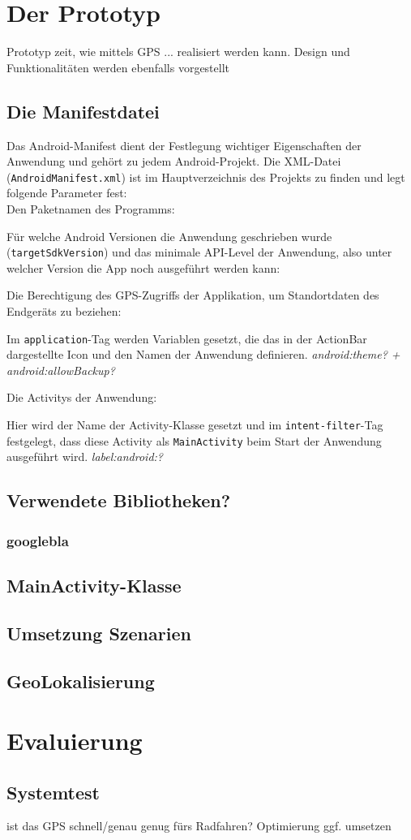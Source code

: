 \chapter{\label{chap:implementierung}Der Prototyp}
Prototyp zeit, wie mittels GPS ... realisiert werden kann.
Design und Funktionalitäten werden ebenfalls vorgestellt
\section{Die Manifestdatei}
Das Android-Manifest dient der Festlegung wichtiger Eigenschaften der Anwendung und gehört zu jedem Android-Projekt. Die \gls{XML}-Datei (\texttt{AndroidManifest.xml}) ist im Hauptverzeichnis des Projekts zu finden und legt folgende Parameter fest: \\
Den Paketnamen des Programms:

Für welche Android Versionen die Anwendung geschrieben wurde (\texttt{targetSdkVersion}) und das minimale \gls{API}-Level der Anwendung, also unter welcher Version die App noch ausgeführt werden kann:

Die Berechtigung des \gls{GPS}-Zugriffs der Applikation, um Standortdaten des Endgeräts zu beziehen:

Im \texttt{application}-Tag werden Variablen gesetzt, die das in der ActionBar dargestellte Icon und den Namen der Anwendung definieren. \textit{android:theme? + android:allowBackup?}

Die \glspl{Activity} der Anwendung:

Hier wird der Name der \gls{Activity}-Klasse gesetzt und im \texttt{intent-filter}-Tag festgelegt, dass diese \gls{Activity} als \texttt{MainActivity} beim Start der Anwendung ausgeführt wird. \textit{label:android:?}
\section{Verwendete Bibliotheken?}
\subsection{googlebla}
\section{MainActivity-Klasse}
\section{Umsetzung Szenarien}
\section{GeoLokalisierung}
%
%
\chapter{Evaluierung}
\section{Systemtest}
ist das GPS schnell/genau genug fürs Radfahren?
Optimierung ggf. umsetzen
